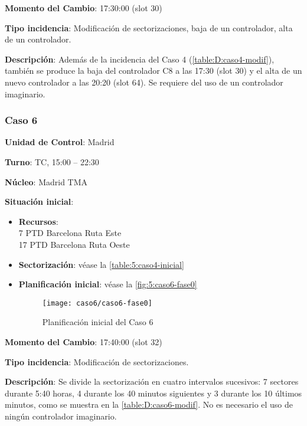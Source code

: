 \textbf{Momento del Cambio}: 17:30:00 (slot 30)

\textbf{Tipo incidencia}: Modificación de sectorizaciones, baja de un controlador, alta de un controlador.

\textbf{Descripción}: Además de la incidencia del Caso 4 (\autoref{table:D:caso4-modif}), también se produce la baja del controlador C8 a las 17:30 (slot 30) y el alta de un nuevo controlador a las 20:20 (slot 64). Se requiere del uso de un controlador imaginario.

\subsubsection{Caso 6}

\textbf{Unidad de Control}: Madrid

\textbf{Turno}: TC, 15:00 -- 22:30

\textbf{Núcleo}: Madrid TMA

\textbf{Situación inicial}:
\begin{itemize}[label={}]
	
	\item \textbf{Recursos}: \\
	7 PTD Barcelona Ruta Este \\
	17 PTD Barcelona Ruta Oeste
	
	\item \textbf{Sectorización}: véase la \autoref{table:5:caso4-inicial}
	
	\item \textbf{Planificación inicial}: véase la \autoref{fig:5:caso6-fase0}
	
	\begin{figure}[!h]
		\centering
		\texttt{[image: caso6/caso6-fase0]}
		\caption{Planificación inicial del Caso 6}
		\label{fig:5:caso6-fase0}
	\end{figure}
	
	
\end{itemize}

\textbf{Momento del Cambio}: 17:40:00 (slot 32)

\textbf{Tipo incidencia}: Modificación de sectorizaciones.

\textbf{Descripción}: Se divide la sectorización en cuatro intervalos sucesivos: 7 sectores durante 5:40 horas, 4 durante los 40 minutos siguientes y 3 durante los 10 últimos minutos, como se muestra en la \autoref{table:D:caso6-modif}. No es necesario el uso de ningún controlador imaginario.

